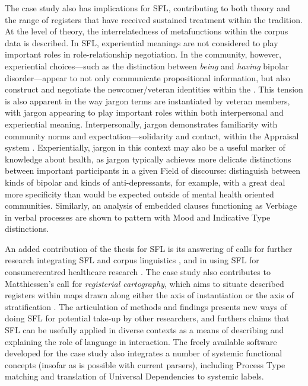 The case study also has implications for \gls{SFL}, contributing to both theory and the range of registers that have received sustained treatment within the tradition. At the level of theory, the interrelatedness of metafunctions within the corpus data is described. In \gls{SFL}, experiential meanings are not considered to play important roles in role\hyp{}relationship negotiation. In the community, however, experiential choices---such as the distinction between \emph{being} and \emph{having} bipolar disorder---appear to not only communicate propositional information, but also construct and negotiate the newcomer\slash veteran identities within the . This tension is also apparent in the way jargon terms are instantiated by veteran members, with jargon appearing to play important roles within both interpersonal and experiential meaning. Interpersonally, jargon demonstrates familiarity with community norms and expectation---solidarity and contact, within the Appraisal system \cite{martin_language_2005}. Experientially, jargon in this context may also be a useful marker of knowledge about health, as jargon typically achieves more delicate distinctions between important participants in a given Field of discourse:   distinguish between kinds of \gls{bipolar} and kinds of anti\hyp{}depressants, for example, with a great deal more specificity than would be expected outside of mental health oriented communities. Similarly, an analysis of embedded clauses functioning as Verbiage in verbal processes are shown to pattern with Mood and Indicative Type distinctions.

An added contribution of the thesis for \gls{SFL} is its answering of calls for further research integrating \gls{SFL} and corpus linguistics \cite{hunston_systemic_2013,thompson_system_2014}, and in using \gls{SFL} for \gls{consumercentred} healthcare research \cite{matthiessen_applying_2013,thompson2001interview}. The case study also contributes to Matthiessen's call for \emph{registerial cartography}, which aims to situate described registers within maps drawn along either the axis of instantiation or the axis of stratification \cite{matthiessen_modeling_2015}. The articulation of methods and findings presents new ways of doing \gls{SFL} for potential take\hyp{}up by other researchers, and furthers claims that \gls{SFL} can be usefully applied in diverse contexts as a means of describing and explaining the role of language in interaction. The freely available software developed for the case study also integrates a number of systemic functional concepts (insofar as is possible with current parsers), including Process Type matching and translation of Universal Dependencies \cite[see][]{nivre_towards_2015} to systemic labels.

